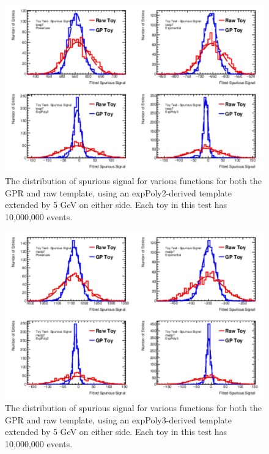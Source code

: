 \begin{figure} 
\begin{center}
  \includegraphics[width=\textwidth]{figures/background/gpr/validation/padded/ToyTest_FitSigVals_lowpT_10M_noSig}   
\caption{The distribution of spurious signal for various functions for both the GPR and raw template, using an expPoly2-derived template extended by 5 GeV on either side. Each toy in this test has 10,000,000 events.}
\label{fig:padded_lowpt_10M_noSig}
\end{center}
\end{figure}

\begin{figure} 
\begin{center}
  \includegraphics[width=\textwidth]{figures/background/gpr/validation/padded/ToyTest_FitSigVals_medpT_10M_noSig}   
\caption{The distribution of spurious signal for various functions for both the GPR and raw template, using an expPoly3-derived template extended by 5 GeV on either side. Each toy in this test has 10,000,000 events.}
\label{fig:padded_medpt_10M_noSig}
\end{center}
\end{figure}

